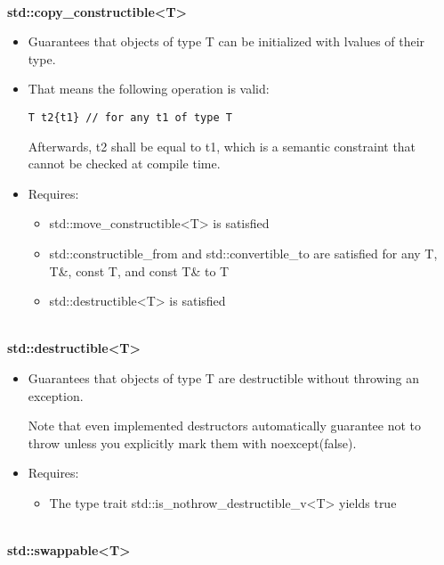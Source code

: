 \noindent
\hspace*{\fill} \\ %
\textbf{std::copy\_constructible<T>}

\begin{itemize}
\item
Guarantees that objects of type T can be initialized with lvalues of their type.

\item
That means the following operation is valid:

\begin{lstlisting}[style=styleCXX]
T t2{t1} // for any t1 of type T
\end{lstlisting}

Afterwards, t2 shall be equal to t1, which is a semantic constraint that cannot be checked at compile time.

\item
Requires:
\begin{itemize}
\item
std::move\_constructible<T> is satisfied

\item
std::constructible\_from and std::convertible\_to are satisfied for any T, T\&, const T, and const T\& to T

\item
std::destructible<T> is satisfied
\end{itemize}
\end{itemize}


\noindent
\hspace*{\fill} \\ %
\textbf{std::destructible<T>}

\begin{itemize}
\item
Guarantees that objects of type T are destructible without throwing an exception.

Note that even implemented destructors automatically guarantee not to throw unless you explicitly mark them with noexcept(false).

\item
Requires:
\begin{itemize}
\item
The type trait std::is\_nothrow\_destructible\_v<T> yields true
\end{itemize}
\end{itemize}

\noindent
\hspace*{\fill} \\ %
\textbf{std::swappable<T>}

